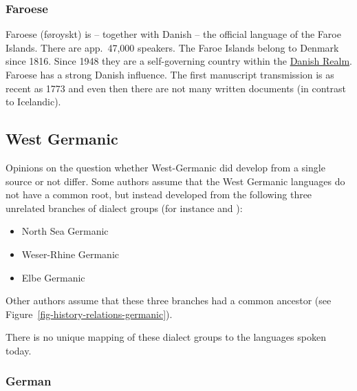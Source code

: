 \subsubsection{Faroese}

Faroese (føroyskt) is -- together with Danish -- the official language of the Faroe Islands. There
are app.\ 47,000 speakers. The Faroe Islands belong to Denmark since 1816. Since 1948 they are a
self-governing country within the \href{https://en.wikipedia.org/wiki/Danish_Realm}{Danish Realm}.
Faroese has a strong Danish influence. The first manuscript transmission is as recent as 1773 and
even then there are not many written documents (in contrast to Icelandic).


\subsection{West Germanic}


Opinions on the question whether West-Germanic did develop from a single source or not differ. Some authors
assume that the West Germanic languages do not have a common root, but instead developed from the
following three unrelated branches of dialect groups (for instance \citealp[--18]{Robinson1992a-u} and
\citealp[]{HvDA94a}):
\begin{itemize}
\item North Sea Germanic %
\item Weser-Rhine Germanic %
\item Elbe Germanic %
\end{itemize}
Other authors assume that these three branches had a common ancestor (see Figure~\ref{fig-history-relations-germanic}).

There is no unique mapping of these dialect groups to the languages spoken today.





\subsubsection{German}

